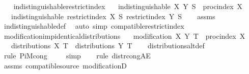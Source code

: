 \begin{isabellebody}
\ \ \isamarkupfalse%
%
\endisatagproof
{\isafoldproof}%
%
\isadelimproof
\isanewline
%
\endisadelimproof
\isanewline
{}\isamarkupfalse%
\ indistinguishable{\isacharunderscore}{\kern0pt}restrict{\isacharunderscore}{\kern0pt}index{\isacharcolon}{\kern0pt}\isanewline
\ \ \ {\isachardoublequoteopen}indistinguishable\ X\ Y{\isachardoublequoteclose}\ {\isachardoublequoteopen}S\ {\isasymsubseteq}\ proc{\isacharunderscore}{\kern0pt}index\ X{\isachardoublequoteclose}\isanewline
\ \ \ {\isachardoublequoteopen}indistinguishable\ {\isacharparenleft}{\kern0pt}restrict{\isacharunderscore}{\kern0pt}index\ X\ S{\isacharparenright}{\kern0pt}\ {\isacharparenleft}{\kern0pt}restrict{\isacharunderscore}{\kern0pt}index\ Y\ S{\isacharparenright}{\kern0pt}{\isachardoublequoteclose}\isanewline
%
\isadelimproof
\ \ %
\endisadelimproof
%
\isatagproof
{}\isamarkupfalse%
\ assms\ \isamarkupfalse%
\ indistinguishable{\isacharunderscore}{\kern0pt}def\ \isamarkupfalse%
\ {\isacharparenleft}{\kern0pt}auto\ simp{\isacharcolon}{\kern0pt}\ compatible{\isacharunderscore}{\kern0pt}restrict{\isacharunderscore}{\kern0pt}index{\isacharparenright}{\kern0pt}%
\endisatagproof
{\isafoldproof}%
%
\isadelimproof
\isanewline
%
\endisadelimproof
\isanewline
{}\isamarkupfalse%
\ modification{\isacharunderscore}{\kern0pt}imp{\isacharunderscore}{\kern0pt}identical{\isacharunderscore}{\kern0pt}distributions{\isacharcolon}{\kern0pt}\isanewline
\ \ \ {\isachardoublequoteopen}modification\ X\ Y{\isachardoublequoteclose}\ {\isachardoublequoteopen}T\ {\isasymsubseteq}\ proc{\isacharunderscore}{\kern0pt}index\ X{\isachardoublequoteclose}\isanewline
\ \ \ {\isachardoublequoteopen}distributions\ X\ T\ {\isacharequal}{\kern0pt}\ distributions\ Y\ T{\isachardoublequoteclose}\isanewline
%
\isadelimproof
\ \ %
\endisadelimproof
%
\isatagproof
{}\isamarkupfalse%
\ distributions{\isacharunderscore}{\kern0pt}altdef\isanewline
\ \ \isamarkupfalse%
\ {\isacharparenleft}{\kern0pt}rule\ PiM{\isacharunderscore}{\kern0pt}cong{\isacharparenright}{\kern0pt}\isanewline
\ \ \ \isamarkupfalse%
\ simp\isanewline
\ \ \isamarkupfalse%
\ {\isacharparenleft}{\kern0pt}rule\ distr{\isacharunderscore}{\kern0pt}cong{\isacharunderscore}{\kern0pt}AE{\isacharparenright}{\kern0pt}\isanewline
\ \ \isamarkupfalse%
\ assms{\isacharparenleft}{\kern0pt}{}{\isacharparenright}{\kern0pt}\ compatible{\isacharunderscore}{\kern0pt}source\ modificationD{\isacharparenleft}{\kern0pt}{}{\isacharparenright}{\kern0pt}\ \isamarkupfalse%

\end{isabellebody}
